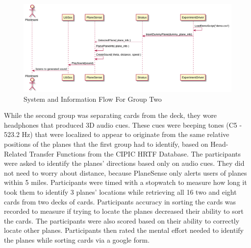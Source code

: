         \begin{figure}
         \includegraphics[width=\linewidth]{./sequence_diagram_for_experiment_g1.png}
         \caption{System and Information Flow For Group Two}
         \label{fig:g2}
       \end{figure}

While the second group was separating cards from the deck, they wore headphones that produced 3D audio cues.
These cues were beeping tones (C5 - 523.2 Hz) that were localized to appear to originate from the same relative positions of the planes that the first group had to identify, based on Head-Related Transfer Functions from the CIPIC HRTF Database.  The participants were asked to identify the planes' directions based only on audio cues.  They did not need to worry about distance, because PlaneSense only alerts users of planes within 5 miles.
Participants were timed with a stopwatch to measure how long it took them to identify 3 planes' locations while retrieving all 16 two and eight cards from two decks of cards.  Participants accuracy in sorting the cards was recorded to measure if trying to locate the planes decreased their ability to sort the cards.  The participants were also scored based on their ability to correctly locate other planes.  Participants then rated the mental effort needed to identify the planes while sorting cards via a google form.


